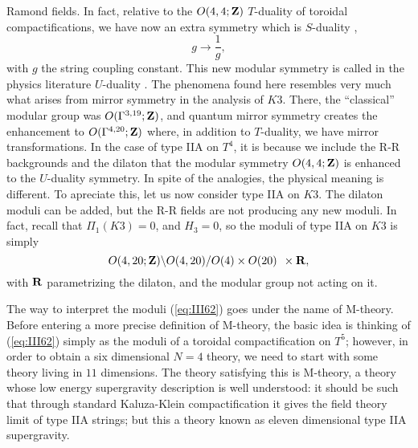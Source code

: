 Ramond fields. In fact, relative to the $O(4,4;{\bf Z})$
$T$-duality of toroidal compactifications, we have now an extra
symmetry which is $S$-duality \cite{MO,rabino,S,mr,HT,Duff,Town,Wsvd,S2,HS,GrMS,VW,HT2},  
\begin{equation}
g \rightarrow \frac {1}{g},
\label{eq:III63}
\end{equation}
with $g$ the string coupling constant. This new modular symmetry
is called in the physics literature $U$-duality \cite{HT}. The phenomena
found here resembles very much what arises from mirror symmetry
in the analysis of $K3$. There, the ``classical'' modular group was $O(\Gamma^{3,19}; 
{\bf Z})$, and quantum mirror symmetry creates the enhancement to
$O(\Gamma^{4,20};{\bf Z})$ where, in addition to $T$-duality, we
have mirror transformations. In the case of type IIA on $T^4$, it
is because we include the R-R backgrounds and the dilaton that
the modular symmetry $O(4,4;{\bf Z})$ is enhanced to the
$U$-duality symmetry. In spite of the analogies, the physical
meaning is different. To apreciate this, let us now consider type
IIA on $K3$. The dilaton moduli can be added, but the R-R fields
are not producing any new moduli. In fact, recall that
$\Pi_1(K3)=0$, and $H_3=0$, so the moduli of type IIA on $K3$ is
simply
\begin{equation}
O(4,20;{\bf Z}) \backslash O(4,20)/O(4) \times O(20) \: \: \times
{\bf R},
\label{eq:III64}
\end{equation}
with ${\bf R}$ parametrizing the dilaton, and the modular group
not acting on it. 
  
The way to interpret the moduli (\ref{eq:III62}) goes under the
name of M-theory. Before entering a more precise definition of
M-theory, the basic idea is thinking of (\ref{eq:III62}) simply
as the moduli of a toroidal compactification on $T^5$; however,
in order to obtain a six dimensional $N\!=\!4$ theory, we need to
start with some theory living in $11$ dimensions. The theory
satisfying this is M-theory, a theory whose low energy
supergravity description is well understood: it should be such
that through standard Kaluza-Klein compactification it gives the
field theory limit of type IIA strings; but this a theory known as eleven
dimensional type IIA supergravity.
  
